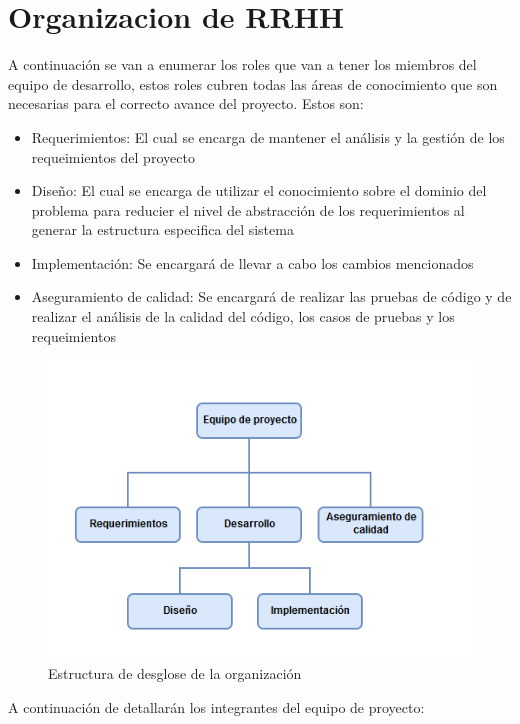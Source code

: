 \section{Organizacion de RRHH}

A continuación se van a enumerar los roles que van a tener los miembros del equipo de desarrollo, estos roles cubren todas las áreas de conocimiento que son necesarias para el correcto avance del proyecto. Estos son:
\begin{itemize}
    \item Requerimientos: El cual se encarga de mantener el análisis y la gestión de los requeimientos del proyecto
    \item Diseño: El cual se encarga de utilizar el conocimiento sobre el dominio del problema para reducier el nivel de abstracción de los requerimientos al generar la estructura especifica del sistema
    \item Implementación: Se encargará de llevar a cabo los cambios mencionados
    \item Aseguramiento de calidad: Se encargará de realizar las pruebas de código y de realizar el análisis de la calidad del código, los casos de pruebas y los requeimientos
\end{itemize}

\begin{figure}[H]
    \centering
    \includegraphics[scale=0.6]{Files/OBS.png}
    \caption{Estructura de desglose de la organización}
    \label{fig:clases}
\end{figure}

A continuación de detallarán los integrantes del equipo de proyecto:


